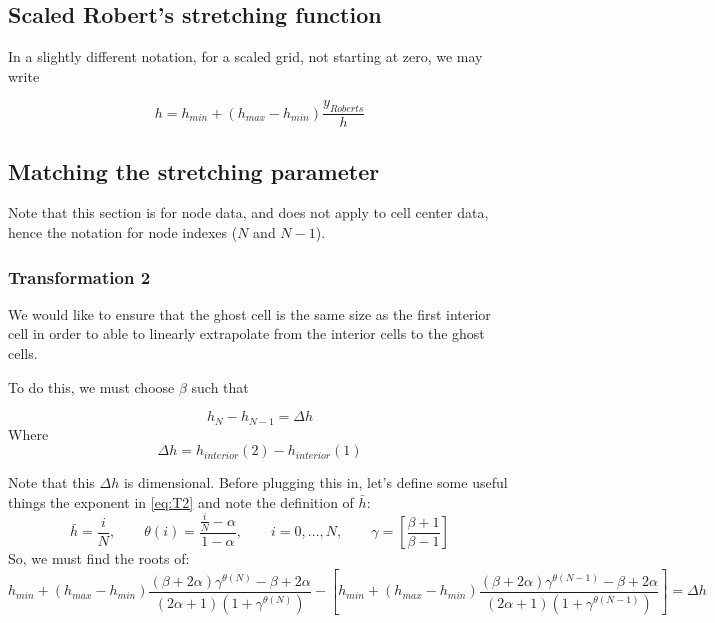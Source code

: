 \documentclass[11pt]{article}
\newcommand{\gammadef}{\left[\frac{\beta+1}{\beta-1}\right]}
\newcommand{\g}{\gamma}
\begin{document}
\subsection{Scaled Robert's stretching function}
In a slightly different notation, for a scaled grid, not starting at zero, we may write

\begin{equation}
	h = h_{min} + (h_{max}-h_{min}) \frac{y_{Roberts}}{h}
\end{equation}

\subsection{Matching the stretching parameter}
Note that this section is for node data, and does not apply to cell center data, hence the notation for node indexes ($N$ and $N-1$).

\subsubsection{Transformation 2}
We would like to ensure that the ghost cell is the same size as the first interior cell in order to able to linearly extrapolate from the interior cells to the ghost cells.

To do this, we must choose $\beta$ such that

\begin{equation}
	h_{N} - h_{N-1} = \Delta h
\end{equation}
Where
\begin{equation}
	\Delta h = h_{interior}(2) - h_{interior}(1)
\end{equation}

Note that this $\Delta h$ is dimensional. Before plugging this in, let's define some useful things the exponent in \ref{eq:T2} and note the definition of $\bar{h}$:
\begin{equation}
	\bar{h} = \frac{i}{N}, \qquad
	\theta(i) = \frac{\frac{i}{N} - \alpha}{1 - \alpha},
	\qquad i=0,...,N,
	\qquad \g = \gammadef
\end{equation}
So, we must find the roots of:
\begin{equation}
	h_{min} + (h_{max}-h_{min}) \frac{(\beta+2\alpha)\g^{\theta(N)} - \beta + 2\alpha}{(2\alpha+1)\left(1+\g^{\theta(N)} \right)}
	-
	\left[
	h_{min} + (h_{max}-h_{min}) \frac{(\beta+2\alpha)\g^{\theta(N-1)} - \beta + 2\alpha}{(2\alpha+1)\left(1+\g^{\theta(N-1)} \right)}
	\right]
	=
	\Delta h
\end{equation}
\end{document}
